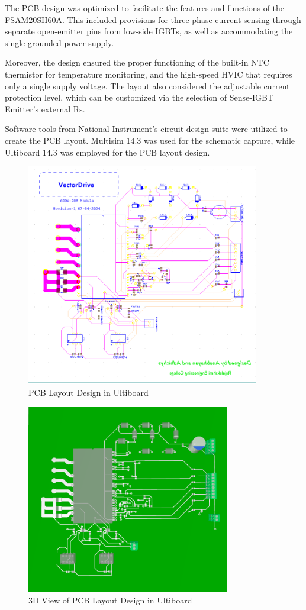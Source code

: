 The PCB design was optimized to facilitate the features and functions of the FSAM20SH60A. This included provisions for three-phase current sensing through separate open-emitter pins from low-side IGBTs, as well as accommodating the single-grounded power supply. 

Moreover, the design ensured the proper functioning of the built-in NTC thermistor for temperature monitoring, and the high-speed HVIC that requires only a single supply voltage. The layout also considered the adjustable current protection level, which can be customized via the selection of Sense-IGBT Emitter's external Rs. 

Software tools from National Instrument's circuit design suite were utilized to create the PCB layout. Multisim 14.3 was used for the schematic capture, while Ultiboard 14.3 was employed for the PCB layout design.

\begin{figure}[H]
	\centering
	\includegraphics[width=4in]{sections/section4/images/PCBDesign/Ultiboard/Ultiboard.png}
	\caption{PCB Layout Design in Ultiboard}
\end{figure}


\begin{figure}[H]
	\centering
	\includegraphics[width=3.5in]{sections/section4/images/PCBDesign/Ultiboard/3DTopView.png}
	\caption{3D View of PCB Layout Design in Ultiboard}
\end{figure}


